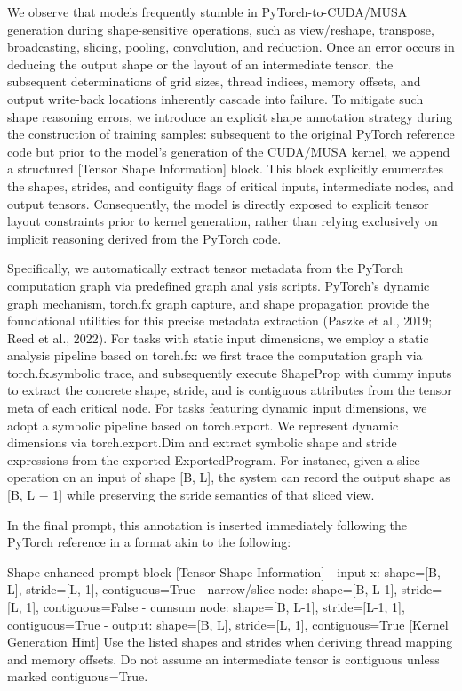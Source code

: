 \documentclass[
  10
]{article}
\newenvironment{Shaded}{}{}
\newcommand{\NormalTok}[1]{#1}
\begin{document}
We observe that models frequently stumble in PyTorch-to-CUDA/MUSA
generation during shape-sensitive operations, such as view/reshape,
transpose, broadcasting, slicing, pooling, convolution, and reduction.
Once an error occurs in deducing the output shape or the layout of an
intermediate tensor, the subsequent determinations of grid sizes, thread
indices, memory offsets, and output write-back locations inherently
cascade into failure. To mitigate such shape reasoning errors, we
introduce an explicit shape annotation strategy during the construction
of training samples: subsequent to the original PyTorch reference code
but prior to the model's generation of the CUDA/MUSA kernel, we append a
structured {[}Tensor Shape Information{]} block. This block explicitly
enumerates the shapes, strides, and contiguity flags of critical inputs,
intermediate nodes, and output tensors. Consequently, the model is
directly exposed to explicit tensor layout constraints prior to kernel
generation, rather than relying exclusively on implicit reasoning
derived from the PyTorch code.

Specifically, we automatically extract tensor metadata from the PyTorch
computation graph via predefined graph anal ysis scripts. PyTorch's
dynamic graph mechanism, torch.fx graph capture, and shape propagation
provide the foundational utilities for this precise metadata extraction
(Paszke et al., 2019; Reed et al., 2022). For tasks with static input
dimensions, we employ a static analysis pipeline based on torch.fx: we
first trace the computation graph via torch.fx.symbolic trace, and
subsequently execute ShapeProp with dummy inputs to extract the concrete
shape, stride, and is contiguous attributes from the tensor meta of each
critical node. For tasks featuring dynamic input dimensions, we adopt a
symbolic pipeline based on torch.export. We represent dynamic dimensions
via torch.export.Dim and extract symbolic shape and stride expressions
from the exported ExportedProgram. For instance, given a slice operation
on an input of shape {[}B, L{]}, the system can record the output shape
as {[}B, L − 1{]} while preserving the stride semantics of that sliced
view.

In the final prompt, this annotation is inserted immediately following
the PyTorch reference in a format akin to the following:

\begin{Shaded}
\begin{Highlighting}[]
\NormalTok{Shape{-}enhanced prompt block}
\NormalTok{[Tensor Shape Information]}
\NormalTok{{-} input x: shape=[B, L], stride=[L, 1], contiguous=True}
\NormalTok{{-} narrow/slice node: shape=[B, L{-}1], stride=[L, 1], contiguous=False}
\NormalTok{{-} cumsum node: shape=[B, L{-}1], stride=[L{-}1, 1], contiguous=True}
\NormalTok{{-} output: shape=[B, L], stride=[L, 1], contiguous=True}
\NormalTok{[Kernel Generation Hint]}
\NormalTok{Use the listed shapes and strides when deriving thread mapping and memory offsets.}
\NormalTok{Do not assume an intermediate tensor is contiguous unless marked contiguous=True. }
\end{Highlighting}
\end{Shaded}
\end{document}
